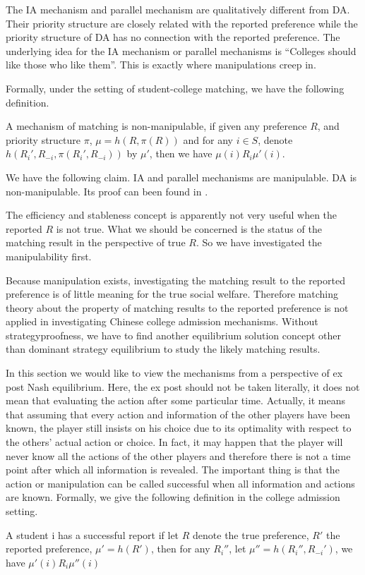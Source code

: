 The IA mechanism and parallel mechanism are qualitatively different from DA. Their
priority structure are closely related with the reported preference
while the priority structure of DA has no connection with the reported
preference. The underlying idea for the IA mechanism or parallel mechanisms is
``Colleges should like those who like them''.  This is exactly where manipulations creep
in.  

Formally, under the setting of student-college matching, we have the following definition.

\begin{definition}
A mechanism of matching is non-manipulable, if given any preference
$R$, and priority structure $\pi$, $\mu = h(R, \pi(R))$ and for any $i
\in S$, denote $h(R_i',R_{-i}, \pi(R_i',R_{-i}))$ by $\mu'$, then we have $\mu(i)R_i \mu'(i)$.
\end{definition}

We have the following claim.
IA and parallel mechanisms are manipulable. DA is non-manipulable.
Its proof can been found in \parencite{YanChenJPE}.
 
\begin{remark}
The efficiency and stableness concept is apparently not very useful when
the reported $R$ is not true. What we should be concerned is the status of the matching
result in the perspective of true $R$. So we have investigated the manipulability first.
\end{remark}

Because manipulation exists, investigating the matching result to the reported preference is of little meaning for the true social welfare. Therefore matching theory about the property of matching results to the reported preference is not applied in investigating Chinese college admission mechanisms. Without strategyproofness, we have to find another equilibrium solution concept other than dominant strategy equilibrium to study the likely matching results.

In this section we would like to view the mechanisms from a perspective of ex post Nash equilibrium.
Here, the ex post should not be taken 
literally, it does not mean that 
evaluating the action after some particular time. Actually, it means that assuming that every action and information of the other players have been known, the player still insists on his choice due to its optimality with respect
to the others' actual action or choice. In fact, it may happen that the player will never know all the actions of the other players and therefore there is not a time point after which all information is revealed. 
The important thing is that the action or manipulation can be called successful when all information and actions are known.
Formally, we give the following definition in the college admission setting. 
\begin{definition}
A student i has a successful report 
if let $R$ denote the true preference, $R'$ the reported preference, $\mu' = h(R')$, then for any $R_i''$, let $\mu''= h(R_i'',R_{-i}')$, we have  $\mu'(i) R_i \mu''(i)$
\end{definition}

